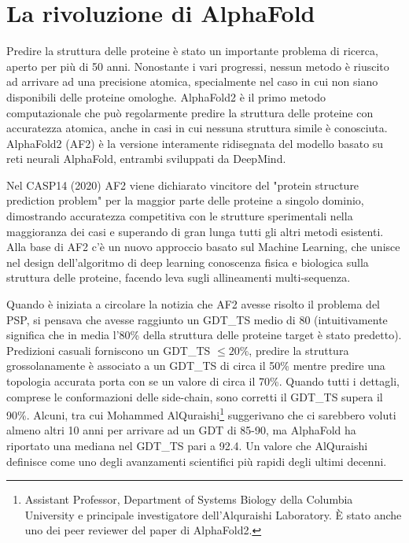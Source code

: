 \chapter{La rivoluzione di AlphaFold}

Predire la struttura delle proteine è stato un importante problema di ricerca, aperto per più di 50 anni. Nonostante i vari progressi, nessun metodo è riuscito ad arrivare ad una precisione atomica, specialmente nel caso in cui non siano disponibili delle proteine omologhe. AlphaFold2 è il primo metodo computazionale che può regolarmente predire la struttura delle proteine con accuratezza atomica, anche in casi in cui nessuna struttura simile è conosciuta\supercite{jumper2021highly}.
AlphaFold2 (AF2) è la versione interamente ridisegnata del modello basato su reti neurali AlphaFold, entrambi sviluppati da DeepMind. 

\par Nel CASP14 (2020) AF2 viene dichiarato vincitore del "protein structure prediction problem" per la maggior parte delle proteine a singolo dominio, dimostrando accuratezza competitiva con le strutture sperimentali nella maggioranza dei casi e superando di gran lunga tutti gli altri metodi esistenti. Alla base di AF2 c'è un nuovo approccio basato sul Machine Learning, che unisce nel design dell'algoritmo di deep learning conoscenza fisica e biologica sulla struttura delle proteine, facendo leva sugli allineamenti multi-sequenza.

\par Quando è iniziata a circolare la notizia che AF2 avesse risolto il problema del PSP, si pensava che avesse raggiunto un GDT\_TS medio di 80 \supercite{moalqAF2} (intuitivamente significa che in media l'80\% della struttura delle proteine target è stato predetto). Predizioni casuali forniscono un GDT\_TS $\leq 20 \%$, predire la struttura grossolanamente è associato a un GDT\_TS di circa il 50\% mentre predire una topologia accurata porta con se un valore di circa il 70\%. Quando tutti i dettagli, comprese le conformazioni delle side-chain, sono corretti il GDT\_TS supera il 90\%. Alcuni, tra cui Mohammed AlQuraishi\footnote{Assistant Professor, Department of Systems Biology della Columbia University e principale investigatore dell'Alquraishi Laboratory. È stato anche uno dei peer reviewer del paper di AlphaFold2\supercite{moalqAF2}.} suggerivano che ci sarebbero voluti almeno altri 10 anni per arrivare ad un GDT di 85-90\supercite{moAlq}, ma AlphaFold ha riportato una mediana nel GDT\_TS pari a 92.4. Un valore che AlQuraishi definisce come uno degli avanzamenti scientifici più rapidi degli ultimi decenni.

